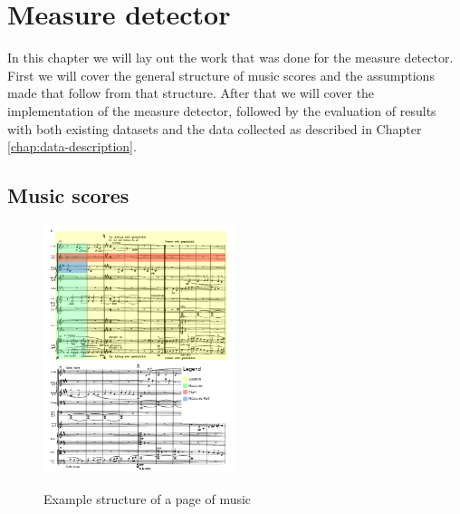 \chapter{Measure detector}\label{chap:measure-detector}

In this chapter we will lay out the work that was done for the measure detector. First we will cover the general structure of music scores and the assumptions made that follow from that structure. After that we will cover the implementation of the measure detector, followed by the evaluation of results with both existing datasets and the data collected as described in Chapter \ref{chap:data-description}.

\section{Music scores}\label{sec:measure-detector-music-scores}

\begin{figure}
    \includegraphics[width=0.5\textwidth]{images/score-structure.png}
    \centering
    \label{fig:page-structure}
    \caption{Example structure of a page of music}
\end{figure}

